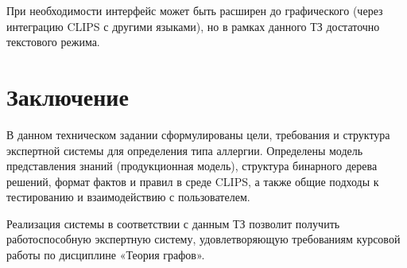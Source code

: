 \documentclass[a4paper,14pt]{extarticle}
\begin{document}
	При необходимости интерфейс может быть расширен до графического (через интеграцию CLIPS с другими языками), но в рамках данного ТЗ достаточно текстового режима.
	
	\newpage
	
	\section*{Заключение}
	
	В данном техническом задании сформулированы цели, требования и структура экспертной системы для определения типа аллергии. Определены модель представления знаний (продукционная модель), структура бинарного дерева решений, формат фактов и правил в среде CLIPS, а также общие подходы к тестированию и взаимодействию с пользователем.
	
	Реализация системы в соответствии с данным ТЗ позволит получить работоспособную экспертную систему, удовлетворяющую требованиям курсовой работы по дисциплине «Теория графов».
	
\end{document}
